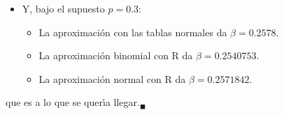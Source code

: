 \begin{solucion}
\begin{itemize}
  \item Y, bajo el supuesto $p = 0.3$:
  \begin{itemize}
   \item La aproximaci\'on con las tablas normales da $\beta = 0.2578$.
   \item La aproximaci\'on binomial con R da $\beta = 0.2540753$.
   \item La aproximaci\'on normal con R da $\beta = 0.2571842$.
  \end{itemize}
 \end{itemize}
 que es a lo que se quer\'{\i}a llegar.${}_{\blacksquare}$
\end{solucion}
